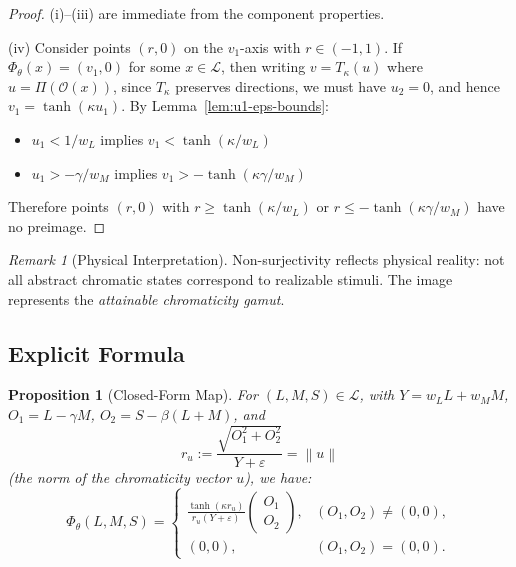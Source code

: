 \documentclass[11pt]{article}
\theoremstyle{plain}
\newtheorem{proposition}[theorem]{Proposition}
\theoremstyle{definition}
\theoremstyle{remark}
\newtheorem{remark}[theorem]{Remark}
\newcommand{\norm}[1]{\left\lVert #1 \right\rVert}
\begin{document}
\begin{proof}
(i)--(iii) are immediate from the component properties.

(iv) Consider points $(r, 0)$ on the $v_1$-axis with $r \in (-1, 1)$. If $\Phi_\theta(x) = (v_1, 0)$ for some $x \in \mathcal{L}$, then writing $v = T_\kappa(u)$ where $u = \Pi(\mathcal{O}(x))$, since $T_\kappa$ preserves directions, we must have $u_2 = 0$, and hence $v_1 = \tanh(\kappa u_1)$. By Lemma~\ref{lem:u1-eps-bounds}:
\begin{itemize}
    \item $u_1 < 1/w_L$ implies $v_1 < \tanh(\kappa/w_L)$
    \item $u_1 > -\gamma/w_M$ implies $v_1 > -\tanh(\kappa\gamma/w_M)$
\end{itemize}
Therefore points $(r, 0)$ with $r \geq \tanh(\kappa/w_L)$ or $r \leq -\tanh(\kappa\gamma/w_M)$ have no preimage.
\end{proof}

\begin{remark}[Physical Interpretation]
Non-surjectivity reflects physical reality: not all abstract chromatic states correspond to realizable stimuli. The image represents the \emph{attainable chromaticity gamut}.
\end{remark}

\subsection{Explicit Formula}

\begin{proposition}[Closed-Form Map]
\label{prop:closed-form}
For $(L, M, S) \in \mathcal{L}$, with $Y = w_L L + w_M M$, $O_1 = L - \gamma M$, $O_2 = S - \beta(L + M)$, and 
\begin{equation}
r_u := \frac{\sqrt{O_1^2 + O_2^2}}{Y + \varepsilon} = \norm{u}
\end{equation}
(the norm of the chromaticity vector $u$), we have:
\begin{equation}
\boxed{
\Phi_\theta(L, M, S) = \begin{cases}
\displaystyle \frac{\tanh(\kappa r_u)}{r_u(Y + \varepsilon)} \begin{pmatrix} O_1 \\ O_2 \end{pmatrix}, & (O_1, O_2) \neq (0,0), \\[1em]
(0,0), & (O_1, O_2) = (0,0).
\end{cases}
}
\end{equation}
\end{proposition}
\end{document}
